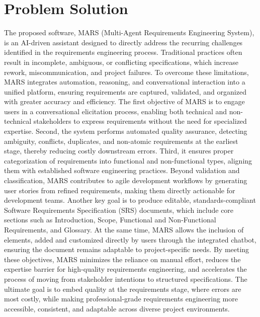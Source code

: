 \section{Problem Solution}
The proposed software, MARS (Multi-Agent Requirements Engineering System), is an AI-driven assistant designed to directly address the recurring challenges identified in the requirements engineering process. Traditional practices often result in incomplete, ambiguous, or conflicting specifications, which increase rework, miscommunication, and project failures. To overcome these limitations, MARS integrates automation, reasoning, and conversational interaction into a unified platform, ensuring requirements are captured, validated, and organized with greater accuracy and efficiency.
The first objective of MARS is to engage users in a conversational elicitation process, enabling both technical and non-technical stakeholders to express requirements without the need for specialized expertise. Second, the system performs automated quality assurance, detecting ambiguity, conflicts, duplicates, and non-atomic requirements at the earliest stage, thereby reducing costly downstream errors. Third, it ensures proper categorization of requirements into functional and non-functional types, aligning them with established software engineering practices.
Beyond validation and classification, MARS contributes to agile development workflows by generating user stories from refined requirements, making them directly actionable for development teams. Another key goal is to produce editable, standards-compliant Software Requirements Specification (SRS) documents, which include core sections such as Introduction, Scope, Functional and Non-Functional Requirements, and Glossary. At the same time, MARS allows the inclusion of elements, added and customized directly by users through the integrated chatbot, ensuring the document remains adaptable to project-specific needs.
By meeting these objectives, MARS minimizes the reliance on manual effort, reduces the expertise barrier for high-quality requirements engineering, and accelerates the process of moving from stakeholder intentions to structured specifications. The ultimate goal is to embed quality at the requirements stage, where errors are most costly, while making professional-grade requirements engineering more accessible, consistent, and adaptable across diverse project environments.


